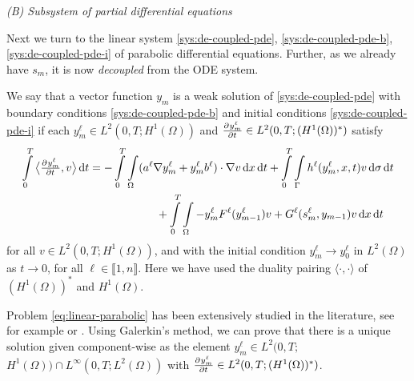 \documentclass[11pt]{article}
\newcommand{\llb}{\llbracket}
\newcommand{\rrb}{\rrbracket}
\numberwithin{equation}{section}
\begin{document}
\vspace{1\baselineskip}
\noindent\emph{(B) Subsystem of partial differential equations}
\vspace{0.5\baselineskip}


Next we turn to the linear system \eqref{sys:de-coupled-pde}, \eqref{sys:de-coupled-pde-b}, \eqref{sys:de-coupled-pde-i} of parabolic differential equations. Further, as we already have \(s_m\), it is now \emph{decoupled} from the ODE system. 

We say that a vector function \(y_m\) is a weak solution of \eqref{sys:de-coupled-pde} with boundary conditions \eqref{sys:de-coupled-pde-b} and initial conditions \eqref{sys:de-coupled-pde-i} if each \(y^\ell_m \in L^2(0,T;H^1(\Omega)) \) and \( \pd{y_m^\ell}{t} \in L^2(0,T;(H^1(\Omega))^*) \)  satisfy
\begin{equation}
\label{eq:linear-parabolic}
\begin{aligned}
	\int\limits_0^T %
	    \big\langle \pd{ y_m^\ell}{t}, v \big\rangle
	\dif t
	&=
	-
	\int\limits_0^T 
	\int\limits_\Omega (a^\ell \nabla y_m^\ell + y_m^\ell b^\ell ) \cdot \nabla v \dif x \dif t
	+
	\int\limits_0^T 
	\int\limits_\Gamma h^\ell (y_{m}^\ell,x,t) v \dif \sigma\dif t 
	\\ &\qquad\qquad\qquad
	+
	\int\limits_0^T \int\limits_\Omega 
	-y_m^\ell F^\ell(y^\ell_{m-1}) v + G^\ell(s_m^\ell, y_{m-1}) v \dif x \dif t
\end{aligned}
\end{equation}
for all \( v \in L^2 (0,T;H^1(\Omega) ) \), and with the initial condition \( y_m^\ell \to y_0^\ell \) in \(L^2(\Omega)\) as \( t\to 0\), for all \(\ell \in \llb 1,n\rrb\). 
Here we have used the duality pairing \(\langle \cdot, \cdot \rangle\) of \( (H^1(\Omega))^*\) and \( H^1(\Omega)\).
	
Problem \eqref{eq:linear-parabolic} has been extensively studied in the literature, see for example \cite{Ladyzenskaja-1968} or \cite{Pao-1993}. Using Galerkin's method, we can prove that there is a unique solution given component-wise as the element \(y_m^\ell \in L^2(0,T;\)  \( H^1(\Omega)) \cap L^\infty(0,T; L^2(\Omega))\) with \( \pd{y_m^\ell}{t} \in L^2(0,T; (H^1(\Omega))^*) \).
\end{document}
